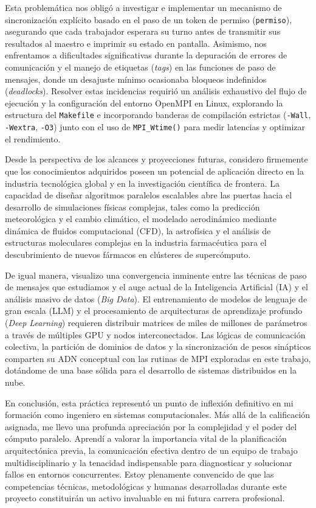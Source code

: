 Esta problemática nos obligó a investigar e implementar un mecanismo de sincronización explícito basado en el paso de un token de permiso (\texttt{permiso}), asegurando que cada trabajador esperara su turno antes de transmitir sus resultados al maestro e imprimir su estado en pantalla. Asimismo, nos enfrentamos a dificultades significativas durante la depuración de errores de comunicación y el manejo de etiquetas (\textit{tags}) en las funciones de paso de mensajes, donde un desajuste mínimo ocasionaba bloqueos indefinidos (\textit{deadlocks}). Resolver estas incidencias requirió un análisis exhaustivo del flujo de ejecución y la configuración del entorno OpenMPI en Linux, explorando la estructura del \texttt{Makefile} e incorporando banderas de compilación estrictas (\texttt{-Wall}, \texttt{-Wextra}, \texttt{-O3}) junto con el uso de \texttt{MPI\_Wtime()} para medir latencias y optimizar el rendimiento.

Desde la perspectiva de los alcances y proyecciones futuras, considero firmemente que los conocimientos adquiridos poseen un potencial de aplicación directo en la industria tecnológica global y en la investigación científica de frontera. La capacidad de diseñar algoritmos paralelos escalables abre las puertas hacia el desarrollo de simulaciones físicas complejas, tales como la predicción meteorológica y el cambio climático, el modelado aerodinámico mediante dinámica de fluidos computacional (CFD), la astrofísica y el análisis de estructuras moleculares complejas en la industria farmacéutica para el descubrimiento de nuevos fármacos en clústeres de supercómputo.

De igual manera, visualizo una convergencia inminente entre las técnicas de paso de mensajes que estudiamos y el auge actual de la Inteligencia Artificial (IA) y el análisis masivo de datos (\textit{Big Data}). El entrenamiento de modelos de lenguaje de gran escala (LLM) y el procesamiento de arquitecturas de aprendizaje profundo (\textit{Deep Learning}) requieren distribuir matrices de miles de millones de parámetros a través de múltiples GPU y nodos interconectados. Las lógicas de comunicación colectiva, la partición de dominios de datos y la sincronización de pesos sinápticos comparten su ADN conceptual con las rutinas de MPI exploradas en este trabajo, dotándome de una base sólida para el desarrollo de sistemas distribuidos en la nube.

En conclusión, esta práctica representó un punto de inflexión definitivo en mi formación como ingeniero en sistemas computacionales. Más allá de la calificación asignada, me llevo una profunda apreciación por la complejidad y el poder del cómputo paralelo. Aprendí a valorar la importancia vital de la planificación arquitectónica previa, la comunicación efectiva dentro de un equipo de trabajo multidisciplinario y la tenacidad indispensable para diagnosticar y solucionar fallos en entornos concurrentes. Estoy plenamente convencido de que las competencias técnicas, metodológicas y humanas desarrolladas durante este proyecto constituirán un activo invaluable en mi futura carrera profesional.
